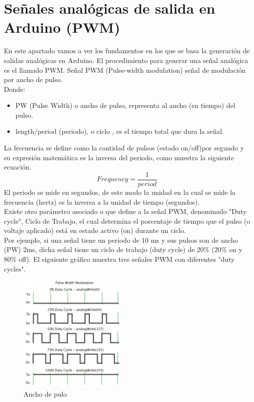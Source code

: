\chapter{Señales analógicas de salida en Arduino (PWM)}

En este apartado vamos a ver los fundamentos en los que se basa la generación de salidas analógicas en Arduino. El procedimiento para generar una señal analógica es el llamado PWM.
Señal PWM (Pulse-width modulation) señal de modulación por ancho de pulso.\\
Donde:\\
\begin{itemize}
\item PW (Pulse Width) o ancho de pulso, representa al ancho (en tiempo) del pulso.
\item length/period (periodo), o ciclo , es el tiempo total que dura la señal.
\end{itemize}
La frecuencia se define como la cantidad de pulsos (estado on/off)por segundo y su expresión matemática es la inversa del periodo, como muestra la siguiente ecuación.
\begin{equation}
Frequency = \frac{1}{period}	
\end{equation}
El periodo se mide en segundos, de este modo la unidad en la cual se mide la frecuencia (hertz) es la inversa a la unidad de tiempo (segundos).\\
Existe otro parámetro asociado o que define a la señal PWM, denominado "Duty cycle", Ciclo de Trabajo, el cual determina el porcentaje de tiempo que el pulso (o voltaje aplicado) está en estado activo (on) durante un ciclo.\\
Por ejemplo, si una señal tiene un periodo de 10 ms y sus pulsos son de ancho (PW) 2ms, dicha señal tiene un ciclo de trabajo (duty cycle) de 20\% (20\% on y 80\% off). El siguiente gráfico muestra tres señales PWM con diferentes "duty cycles".\\
\begin{figure}[!htp]
	\centering
	\includegraphics[width=150pt]{./Imagenes/Documentos/ArduinoNotebook_img10.png}
	\caption[ancho de pulso de modulación]{Ancho de pulo}
\end{figure}

